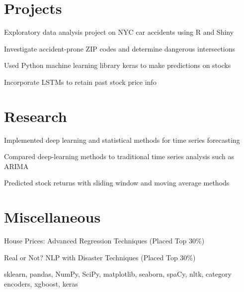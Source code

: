 \documentclass[]{deedy-resume-openfont}
\begin{document}
\begin{minipage}[t]{0.66\textwidth}

\section{Projects}
\location{}
\begin{tightemize} 
\item Exploratory data analysis project on NYC car accidents using R and Shiny
\item Investigate accident-prone ZIP codes and determine dangerous intersections
\end{tightemize}
\location{}
\begin{tightemize} 
\item Used Python machine learning library keras to make predictions on stocks
\item Incorporate LSTMs to retain past stock price info
\end{tightemize}
\sectionsep


\section{Research}
\begin{tightemize} 
\item Implemented deep learning and statistical methods for time series forecasting
\item Compared deep-learning methods to traditional time series analysis such as ARIMA
\item Predicted stock returns with sliding window and moving average methods
\end{tightemize}
\sectionsep



\section{Miscellaneous}
\location{}
\begin{tightemize} 
\item House Prices: Advanced Regression Techniques (Placed Top 30\%)
\item Real or Not? NLP with Disaster Techniques (Placed Top 30\%)
\end{tightemize}
\location{}
\begin{tightemize}
\item sklearn, pandas, NumPy, SciPy, matplotlib, seaborn, spaCy, nltk, category encoders, xgboost, keras 
\end{tightemize}
\sectionsep



\end{minipage} 
\end{document}
